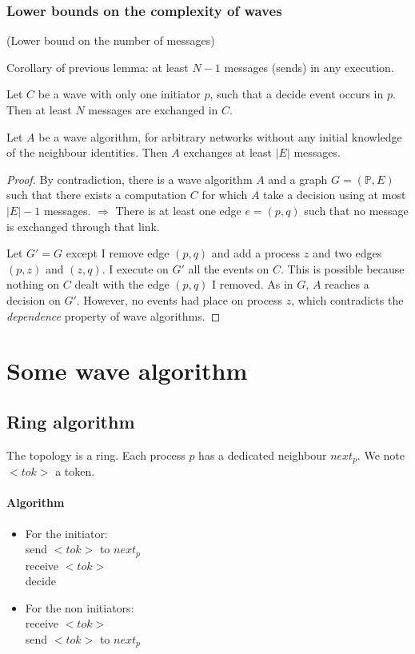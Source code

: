 \subsubsection{Lower bounds on the complexity of waves}
(Lower bound on the number of messages)

Corollary of previous lemma: at least $N-1$ messages (sends) in any execution.

\begin{thm}
Let $C$ be a wave with only one initiator $p$, such that a decide event occurs in $p$. Then at least $N$ messages are exchanged in $C$.
\end{thm}

\begin{thm}
Let $A$ be a wave algorithm, for arbitrary networks without any initial knowledge of the neighbour identities. Then $A$ exchanges at least $|E|$ messages.
\end{thm}

\begin{proof}
By contradiction, there is a wave algorithm $A$ and a graph $G=(\mathbb{P},E)$ such that there exists a computation $C$ for which $A$ take a decision using at most $|E| - 1$ messages. $\Rightarrow$ There is at least one edge $e=(p,q)$ such that no message is exchanged through that link.

Let $G'=G$ except I remove edge $(p,q)$ and add a process $z$ and two edges $(p,z)$ and $(z,q)$. I execute on $G'$ all the events on $C$. This is possible because nothing on $C$ dealt with the edge $(p,q)$ I removed. As in $G$, $A$ reaches a decision on $G'$. However, no events had place on process $z$, which contradicts the \emph{dependence} property of wave algorithms.
\end{proof}

\section{Some wave algorithm}
\subsection{Ring algorithm}
The topology is a ring. Each process $p$ has a dedicated neighbour $next_p$. We note $<tok>$ a token.

\paragraph{Algorithm}
\begin{itemize}
\item For the initiator:\\
send $<tok>$ to $next_p$\\
receive $<tok>$\\
decide
\item For the non initiators:\\
receive $<tok>$\\
send $<tok>$ to $next_p$
\end{itemize}


